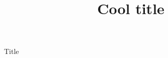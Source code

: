 \documentclass{article}
\title{Cool title}
\date{}
\begin{document}
\maketitle





Title
\end{document}
